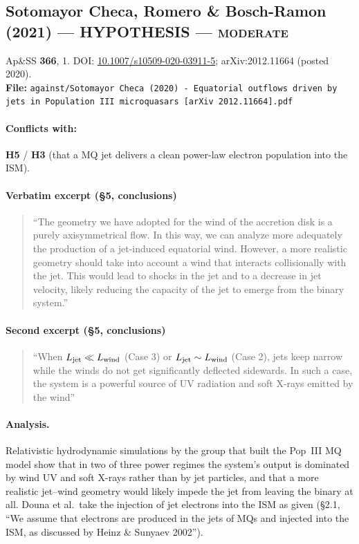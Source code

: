 \documentclass[11pt,a4paper]{article}
\newcommand{\HYP}{\textcolor{blue!60!black}{\textbf{HYPOTHESIS}}}
\begin{document}
\subsection{Sotomayor Checa, Romero \& Bosch-Ramon (2021) --- \HYP{} --- \textsc{moderate}}
\noindent Ap\&SS \textbf{366}, 1. DOI:
\href{https://doi.org/10.1007/s10509-020-03911-5}{10.1007/s10509-020-03911-5};
arXiv:2012.11664 (posted 2020).\\
\textbf{File:} \texttt{against/Sotomayor Checa (2020) - Equatorial outflows driven by jets in Population III microquasars [arXiv 2012.11664].pdf}

\paragraph{Conflicts with:} \textbf{H5} / \textbf{H3} (that a MQ jet delivers a
clean power-law electron population into the ISM).

\paragraph{Verbatim excerpt (\S5, conclusions)}
\begin{quote}\small
``The geometry we have adopted for the wind of the accretion disk is a purely
axisymmetrical flow. In this way, we can analyze more adequately the production
of a jet-induced equatorial wind. However, a more realistic geometry should take
into account a wind that interacts collisionally with the jet. This would lead to
shocks in the jet and to a decrease in jet velocity, likely reducing the capacity
of the jet to emerge from the binary system.''
\end{quote}

\paragraph{Second excerpt (\S5, conclusions)}
\begin{quote}\small
``When $L_{\rm jet} \ll L_{\rm wind}$ (Case 3) or $L_{\rm jet}\sim L_{\rm wind}$
(Case 2), jets keep narrow while the winds do not get significantly deflected
sidewards. In such a case, the system is a powerful source of UV radiation and
soft X-rays emitted by the wind''
\end{quote}

\paragraph{Analysis.}
Relativistic hydrodynamic simulations by the group that built the Pop~III MQ
model show that in two of three power regimes the system's output is dominated
by wind UV and soft X-rays rather than by jet particles, and that a more
realistic jet--wind geometry would likely impede the jet from leaving the binary
at all. Douna et al.\ take the injection of jet electrons into the ISM as given
(\S2.1, ``We assume that electrons are produced in the jets of MQs and injected
into the ISM, as discussed by Heinz \& Sunyaev 2002'').
\end{document}
